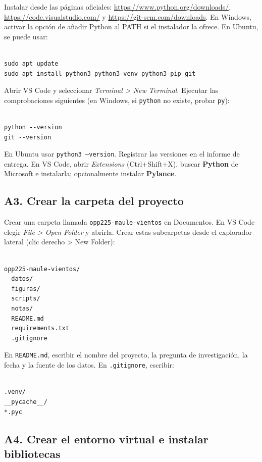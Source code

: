 \documentclass[11pt,a4paper]{article}
\begin{document}
Instalar desde las páginas oficiales: \url{https://www.python.org/downloads/}, \url{https://code.visualstudio.com/} y \url{https://git-scm.com/downloads}. En Windows, activar la opción de añadir Python al PATH si el instalador la ofrece. En Ubuntu, se puede usar:

\begin{lstlisting}

sudo apt update
sudo apt install python3 python3-venv python3-pip git
\end{lstlisting}

Abrir VS Code y seleccionar \emph{Terminal > New Terminal}. Ejecutar las comprobaciones siguientes (en Windows, si \texttt{python} no existe, probar \texttt{py}):

\begin{lstlisting}

python --version
git --version
\end{lstlisting}

En Ubuntu usar \texttt{python3 --version}. Registrar las versiones en el informe de entrega. En VS Code, abrir \emph{Extensions} (Ctrl+Shift+X), buscar \textbf{Python} de Microsoft e instalarla; opcionalmente instalar \textbf{Pylance}.

\subsection*{A3. Crear la carpeta del proyecto}

Crear una carpeta llamada \texttt{opp225-maule-vientos} en Documentos. En VS Code elegir \emph{File > Open Folder} y abrirla. Crear estas subcarpetas desde el explorador lateral (clic derecho > New Folder):

\begin{lstlisting}

opp225-maule-vientos/
  datos/
  figuras/
  scripts/
  notas/
  README.md
  requirements.txt
  .gitignore
\end{lstlisting}

En \texttt{README.md}, escribir el nombre del proyecto, la pregunta de investigación, la fecha y la fuente de los datos. En \texttt{.gitignore}, escribir:

\begin{lstlisting}

.venv/
__pycache__/
*.pyc
\end{lstlisting}

\subsection*{A4. Crear el entorno virtual e instalar bibliotecas}
\end{document}
